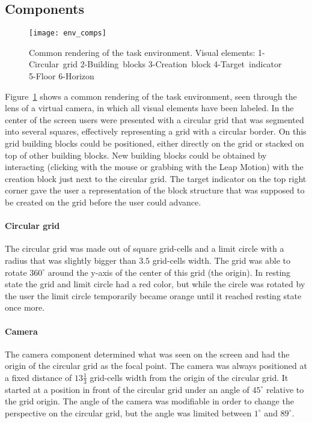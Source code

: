 \subsection{Components}\label{sec:components}

\begin{figure}[H]
\centering
\texttt{[image: env\_comps]}
\caption{\label{fig:environmentcomps} Common rendering of the task environment. Visual elements: 1-Circular~grid 2-Building~blocks 3-Creation~block 4-Target~indicator 5-Floor 6-Horizon}
\end{figure}

\noindent Figure~\ref{fig:environmentcomps} shows a common rendering of the task environment, seen through the lens of a virtual camera, in which all visual elements have been labeled. In the center of the screen users were presented with a circular grid that was segmented into several squares, effectively representing a grid with a circular border. On this grid building blocks could be positioned, either directly on the grid or stacked on top of other building blocks. New building blocks could be obtained by interacting (clicking with the mouse or grabbing with the Leap Motion) with the creation block just next to the circular grid. The target indicator on the top right corner gave the user a representation of the block structure that was supposed to be created on the grid before the user could advance.

\paragraph{Circular grid}
The circular grid was made out of square grid-cells and a limit circle with a radius that was slightly bigger than $3.5$ grid-cells width. The grid was able to rotate $360^{\circ}$ around the y-axis of the center of this grid (the origin). In resting state the grid and limit circle had a red color, but while the circle was rotated by the user the limit circle temporarily became orange until it reached resting state once more. 

\paragraph{Camera}
The camera component determined what was seen on the screen and had the origin of the circular grid as the focal point. The camera was always positioned at a fixed distance of $13 \frac{1}{3}$ grid-cells width from the origin of the circular grid. It started at a position in front of the circular grid under an angle of $45^{\circ}$ relative to the grid origin. The angle of the camera was modifiable in order to change the perspective on the circular grid, but the angle was limited between $1^{\circ}$ and $89^{\circ}$.

